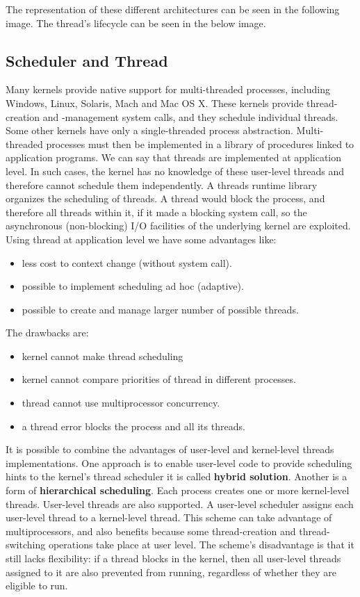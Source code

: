 The representation of these different architectures can be seen in the following image.
The thread's lifecycle can be seen in the below image.

\subsection{Scheduler and Thread}
Many kernels provide native support for multi-threaded processes, including Windows, Linux, Solaris, Mach and Mac OS X. These kernels provide thread-creation and -management system calls, and they schedule individual threads. Some other kernels have only a single-threaded process abstraction. Multi- threaded processes must then be implemented in a library of procedures linked to application programs. We can say that threads are implemented at application level. In such cases, the kernel has no knowledge of these user-level threads and therefore cannot schedule them independently. A threads runtime library organizes the scheduling of threads. A thread would block the process, and therefore all threads within it, if it made a blocking system call, so the asynchronous (non-blocking) I/O facilities of the underlying kernel are exploited.\\
Using thread at application level we have some advantages like:

\begin{itemize}
	\item less cost to context change (without system call).
	\item possible to implement scheduling ad hoc (adaptive).
	\item possible to create and manage larger number of possible threads.
\end{itemize}

The drawbacks are:
\begin{itemize}
	\item kernel cannot make thread scheduling 
	\item kernel cannot compare priorities of thread in different processes.
	\item thread cannot use multiprocessor concurrency.
	\item a thread error blocks the process and all its threads.
\end{itemize}
It is possible to combine the advantages of user-level and kernel-level threads implementations. One approach is to enable user-level code to provide scheduling hints to the kernel’s thread scheduler it is called \textbf{hybrid solution}. Another is a form of \textbf{hierarchical scheduling}. Each process creates one or more kernel-level threads. User-level threads are also supported. A user-level scheduler assigns each user-level thread to a kernel-level thread. This scheme can take advantage of multiprocessors, and also benefits because some thread-creation and thread-switching operations take place at user level. The scheme’s disadvantage is that it still lacks flexibility: if a thread blocks in the kernel, then all user-level threads assigned to it are also prevented from running, regardless of whether they are eligible to run.


